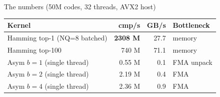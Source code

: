 \documentclass[aspectratio=169,12pt]{beamer}
\begin{document}
\begin{frame}{The numbers (50M codes, 32 threads, AVX2 host)}

\begin{center}
\begin{tabular}{lrrl}
\toprule
Kernel & cmp/s & GB/s & Bottleneck \\
\midrule
Hamming top-1 (NQ=8 batched) & \textbf{2308 M} & 27.7 & memory \\
Hamming top-100              & 740 M           & 71.1 & memory \\
Asym $b=1$ (single thread)   & 0.55 M          & 0.1  & FMA unpack \\
Asym $b=2$ (single thread)   & 2.19 M          & 0.4  & FMA \\
Asym $b=4$ (single thread)   & 2.36 M          & 0.9  & FMA \\
\bottomrule
\end{tabular}
\end{center}

\vspace{1pt}
\end{frame}
\end{document}
